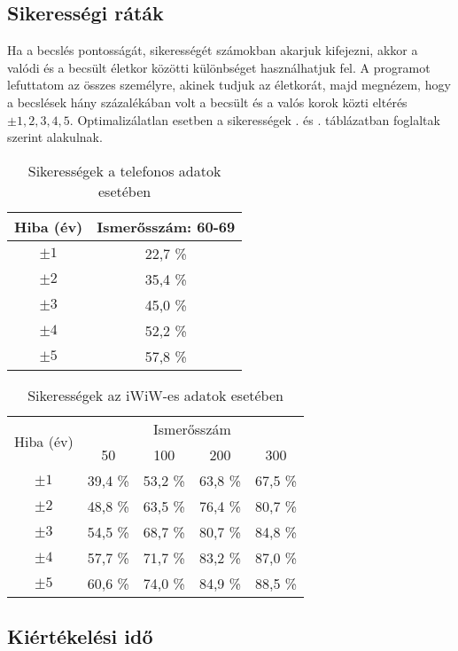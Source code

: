 \documentclass[12pt]{article}
\begin{document}
\subsection{Sikerességi ráták}
Ha a becslés pontosságát, sikerességét számokban akarjuk kifejezni, akkor a valódi és a becsült életkor közötti különbséget használhatjuk fel. A programot lefuttatom az összes személyre, akinek tudjuk az életkorát, majd megnézem, hogy a becslések hány százalékában volt a becsült és a valós korok közti eltérés $\pm 1, 2,3,4,5$. Optimalizálatlan esetben a sikerességek . és . táblázatban foglaltak szerint alakulnak.
\begin{table}[H]
	\centering
	\begin{tabular}{|c|c|}
		\hline
		Hiba (év) & Ismerősszám: 60-69 \\
		\hline
		$\pm 1$ & 22,7 \% \\
		\hline
		$\pm 2$ & 35,4 \% \\
		\hline
		$\pm 3$ & 45,0 \% \\
		\hline
		$\pm 4$ & 52,2 \% \\
		\hline
		$\pm 5$ & 57,8 \% \\
		\hline
	\end{tabular}
	\caption{Sikerességek a telefonos adatok esetében}
	\label{telefon_sikeresseg_nemopt}
\end{table}
\begin{table}[H]
	\centering
	\begin{tabular}{|c|c|c|c|c|}
		\hline
		\multirow{2}{*}{Hiba (év)} & \multicolumn{4}{|c|}{Ismerősszám} \\ \cline{2-5} & 50 & 100 & 200 & 300 \\
		\hline
		$\pm 1$ & 39,4 \% & 53,2 \% & 63,8 \% & 67,5 \% \\
		\hline
		$\pm 2$ & 48,8 \% & 63,5 \% & 76,4 \% & 80,7 \% \\
		\hline
		$\pm 3$ & 54,5 \% & 68,7 \% & 80,7 \% & 84,8 \% \\
		\hline
		$\pm 4$ & 57,7 \% & 71,7 \% & 83,2 \% & 87,0 \% \\
		\hline
		$\pm 5$ & 60,6 \% & 74,0 \% & 84,9 \% & 88,5 \% \\
		\hline
	\end{tabular}
	\caption{Sikerességek az iWiW-es adatok esetében}
	\label{iwiw_sikeresseg_nemopt}
\end{table}

\subsection{Kiértékelési idő}
\end{document}
